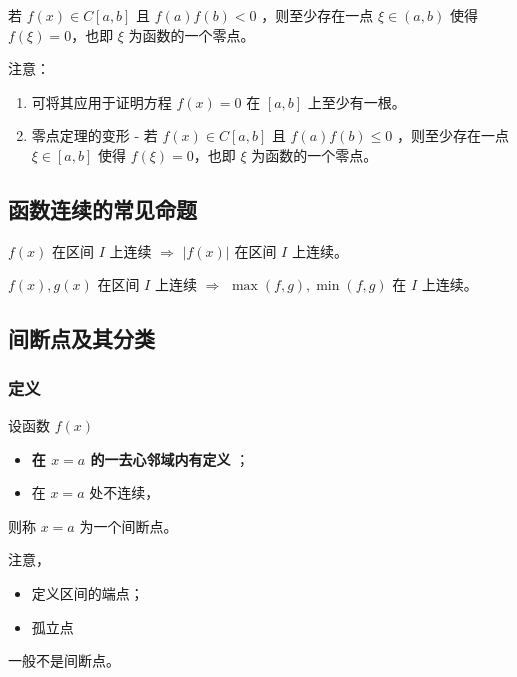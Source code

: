\begin{Def}[零点定理]

    若 $ f(x)\in C[a,b] $ 且 $ f(a)f(b)<0 $ ，则至少存在一点 $ \xi\in (a,b) $ 使得
    $ f(\xi)=0 $，也即 $ \xi $ 为函数的一个零点。
\end{Def}

注意：
\begin{enumerate}
    \item 可将其应用于证明方程 $ f(x)=0 $ 在 $ [a,b] $ 上至少有一根。
    \item 零点定理的变形 - 若 $ f(x)\in C[a,b] $ 且 $ f(a)f(b)\leq0 $ ，则至少存在一点 $ \xi\in [a,b] $ 使得
    $ f(\xi)=0 $，也即 $ \xi $ 为函数的一个零点。
\end{enumerate}

\subsection{函数连续的常见命题}

\begin{Field}[连续命题1]

    $ f(x) $ 在区间 $ I $ 上连续 $ \Rightarrow $ $ |f(x)| $ 在区间 $ I $ 上连续。
\end{Field}

\begin{Field}[连续命题2]

    $ f(x),g(x)$ 在区间 $ I $ 上连续 $ \Rightarrow $ $ \max(f,g),\min(f,g) $ 在 $ I $ 上连续。
\end{Field}

\subsection{间断点及其分类}

\subsubsection{定义}

\begin{Def}[间断点]

    设函数 $ f(x) $ 
    \begin{itemize}
        \item \textbf{在 $ x=a $ 的一去心邻域内有定义 }；
        \item 在 $ x=a $ 处不连续，
    \end{itemize}
    则称 $ x=a $ 为一个间断点。
\end{Def}

注意，
\begin{itemize}
    \item 定义区间的端点；
    \item 孤立点
\end{itemize}
一般不是间断点。

